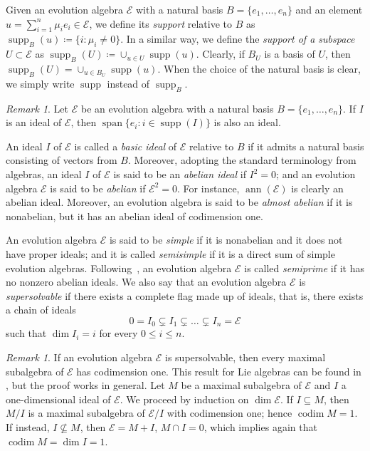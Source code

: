 \documentclass[12pt,reqno]{amsart}
\theoremstyle{definition}
\theoremstyle{remark}
\newtheorem{remark}[theorem]{Remark}
\DeclareMathOperator{\ann}{ann}
\DeclareMathOperator{\spa}{span}
\DeclareMathOperator{\supp}{supp}
\DeclareMathOperator{\codim}{codim}
\numberwithin{equation}{section}
\begin{document}
Given an evolution algebra $\mathcal{E}$ with a natural basis $B=\{e_1,\dots,e_n\}$ and an element $u=\sum_{i=1}^n\mu_ie_i\in\mathcal{E}$, we define its \textit{support} relative to $B$ as $\supp_B(u)\coloneqq\{i:\mu_i\neq0\}$. In a similar way, we define the \textit{support of a subspace} $U\subset\mathcal{E}$ as $\supp_B(U)\coloneqq\cup_{u\in U}\supp(u)$. Clearly, if $B_U$ is a basis of $U$, then $\supp_B(U)=\cup_{u\in B_U}\supp(u)$. When the choice of the natural basis is clear, we simply write $\supp$ instead of $\supp_B$.

\begin{remark}\label{rem:id}
	Let $\mathcal{E}$ be an evolution algebra with a natural basis $B=\{e_1,\dots,e_n\}$. If $I$ is an ideal of $\mathcal{E}$, then $\spa\{e_i\colon i\in\supp(I)\}$ is also an ideal. 
\end{remark}

An ideal $I$ of $\mathcal{E}$ is called a \textit{basic ideal} of $\mathcal{E}$ relative to $B$ if it admits a natural basis consisting of vectors from $B$. Moreover, adopting the standard terminology from algebras, an ideal $I$ of $\mathcal{E}$ is said to be an \textit{abelian ideal} if $I^2=0$; and an evolution algebra $\mathcal{E}$ is said to be \textit{abelian} if $\mathcal{E}^2=0$. For instance, $\ann(\mathcal{E})$ is clearly an abelian ideal. Moreover, an evolution algebra is said to be \textit{almost abelian} if it is nonabelian, but it has an abelian ideal of codimension one.

An evolution algebra $\mathcal{E}$ is said to be \textit{simple} if it is nonabelian and it does not have proper ideals; and it is called \textit{semisimple} if it is a direct sum of simple evolution algebras. Following~\cite{CSV_16_semiprime}, an evolution algebra $\mathcal{E}$ is  called \textit{semiprime} if it has no nonzero abelian ideals.
We also say that an evolution algebra $\mathcal{E}$ is \textit{supersolvable} if there exists a complete flag made up of ideals, that is, there exists a chain of ideals \[0=I_0\subsetneq I_1\subsetneq\dots\subsetneq I_n=\mathcal{E}\] such that $\dim{I_i}=i$ for every $0\leq i\leq n$.

\begin{remark}
If an evolution algebra $\mathcal{E}$ is supersolvable, then every maximal subalgebra of $\mathcal{E}$ has codimension one. This result for Lie algebras can be found in \cite[Theorem~7]{B_67_cohom}, but the proof works in general. Let $M$ be a maximal subalgebra of $\mathcal{E}$ and $I$ a one-dimensional ideal of $\mathcal{E}$. We proceed by induction on $\dim{\mathcal{E}}$. If $I \subseteq M$, then $M/I$ is a maximal subalgebra of $\mathcal{E}/I$ with codimension one; hence $\codim{M}=1$. If instead, $I\nsubseteq M$, then $\mathcal{E}=M+I$, $M\cap I=0$, which implies again that $\codim{M}=\dim{I} = 1$.
\end{remark}
\end{document}
